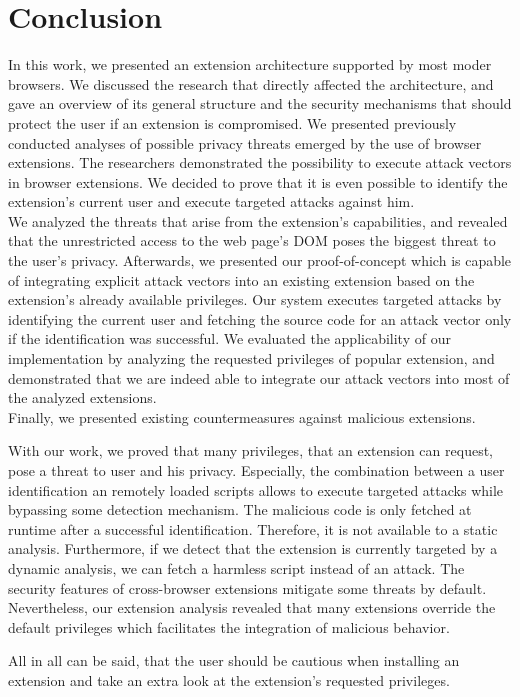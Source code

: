 
\chapter{Conclusion}
\label{chp:conclusion}

	In this work, we presented an extension architecture supported by most moder browsers. We discussed the research that directly affected the architecture, and gave an overview of its general structure and the security mechanisms that should protect the user if an extension is compromised. We presented previously conducted analyses of possible privacy threats emerged by the use of browser extensions. The researchers demonstrated the possibility to execute attack vectors in browser extensions. We decided to prove that it is even possible to identify the extension's current user and execute targeted attacks against him. \\
	We analyzed the threats that arise from the extension's capabilities, and revealed that the unrestricted access to the web page's DOM poses the biggest threat to the user's privacy. Afterwards, we presented our proof-of-concept which is capable of integrating explicit attack vectors into an existing extension based on the extension's already available privileges. Our system executes targeted attacks by identifying the current user and fetching the source code for an attack vector only if the identification was successful. We evaluated the applicability of our implementation by analyzing the requested privileges of popular extension, and demonstrated that we are indeed able to integrate our attack vectors into most of the analyzed extensions. \\
	Finally, we presented existing countermeasures against malicious extensions.
	
	With our work, we proved that many privileges, that an extension can request, pose a threat to user and his privacy. Especially, the combination between a user identification an remotely loaded scripts allows to execute targeted attacks while bypassing some detection mechanism. The malicious code is only fetched at runtime after a successful identification. Therefore, it is not available to a static analysis. Furthermore, if we detect that the extension is currently targeted by a dynamic analysis, we can fetch a harmless script instead of an attack. The security features of cross-browser extensions mitigate some threats by default. Nevertheless, our extension analysis revealed that many extensions override the default privileges which facilitates the integration of malicious behavior. 

	All in all can be said, that the user should be cautious when installing an extension and take an extra look at the extension's requested privileges.